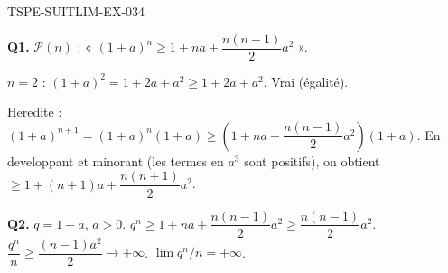 \begin{corrige}{TSPE-SUITLIM-EX-034}

\textbf{Q1.} $\mathcal{P}(n)$ : « $(1+a)^n \geq 1+na+\dfrac{n(n-1)}{2}a^2$ ».

$n=2$ : $(1+a)^2 = 1+2a+a^2 \geq 1+2a+a^2$. Vrai (égalité).

Heredite : $(1+a)^{n+1} = (1+a)^n(1+a) \geq (1+na+\dfrac{n(n-1)}{2}a^2)(1+a)$. En developpant et minorant (les termes en $a^3$ sont positifs), on obtient $\geq 1+(n+1)a+\dfrac{n(n+1)}{2}a^2$.

\textbf{Q2.} $q = 1+a$, $a>0$. $q^n \geq 1+na+\dfrac{n(n-1)}{2}a^2 \geq \dfrac{n(n-1)}{2}a^2$. $\dfrac{q^n}{n} \geq \dfrac{(n-1)a^2}{2} \to +\infty$. $\boxed{\lim q^n/n = +\infty}$.

\end{corrige}
